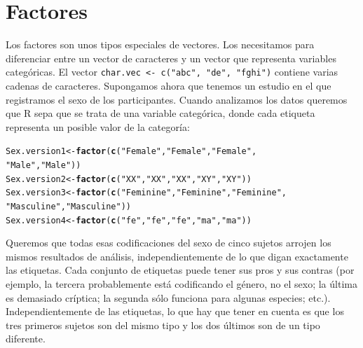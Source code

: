 \documentclass{config/apuntes}\usepackage[]{graphicx}\usepackage[]{xcolor}
\makeatletter
\newcommand{\hlsng}[1]{\textcolor[rgb]{0.192,0.494,0.8}{#1}}%
\newcommand{\hldef}[1]{\textcolor[rgb]{0.345,0.345,0.345}{#1}}%
\newcommand{\hlkwb}[1]{\textcolor[rgb]{0.69,0.353,0.396}{#1}}%
\newcommand{\hlkwd}[1]{\textcolor[rgb]{0.737,0.353,0.396}{\textbf{#1}}}%
\newenvironment{kframe}{%
 \def\at@end@of@kframe{}%
 \ifinner\ifhmode%
  \def\at@end@of@kframe{\end{minipage}}%
  \begin{minipage}{\columnwidth}%
 \fi\fi%
 \def\FrameCommand##1{\hskip\@totalleftmargin \hskip-\fboxsep
 \colorbox{shadecolor}{##1}\hskip-\fboxsep
     \hskip-\linewidth \hskip-\@totalleftmargin \hskip\columnwidth}%
 \MakeFramed {\advance\hsize-\width
   \@totalleftmargin\z@ \linewidth\hsize
   \@setminipage}}%
 {\par\unskip\endMakeFramed%
 \at@end@of@kframe}
\newenvironment{knitrout}{}{} %
\newcommand{\code}[1]{\texttt{#1}}
\makeatother
\begin{document}
\section{Factores}
Los factores son unos tipos especiales de vectores. Los necesitamos para diferenciar entre un vector de caracteres y un vector que representa variables categóricas. El vector \code{char.vec <- c("abc", "de", "fghi")} contiene varias cadenas de caracteres. Supongamos ahora que tenemos un estudio en el que registramos el sexo de los participantes. Cuando analizamos los datos queremos que R sepa que se trata de una variable categórica, donde cada etiqueta representa un posible valor de la categoría:
\begin{knitrout}
\color{fgcolor}\begin{kframe}
\begin{alltt}
\hldef{Sex.version1} \hlkwb{<-} \hlkwd{factor}\hldef{(}\hlkwd{c}\hldef{(}\hlsng{"Female"}\hldef{,} \hlsng{"Female"}\hldef{,} \hlsng{"Female"}\hldef{,}
                         \hlsng{"Male"}\hldef{,} \hlsng{"Male"}\hldef{))}
\hldef{Sex.version2} \hlkwb{<-} \hlkwd{factor}\hldef{(}\hlkwd{c}\hldef{(}\hlsng{"XX"}\hldef{,} \hlsng{"XX"}\hldef{,} \hlsng{"XX"}\hldef{,} \hlsng{"XY"}\hldef{,} \hlsng{"XY"}\hldef{))}
\hldef{Sex.version3} \hlkwb{<-} \hlkwd{factor}\hldef{(}\hlkwd{c}\hldef{(}\hlsng{"Feminine"}\hldef{,} \hlsng{"Feminine"}\hldef{,} \hlsng{"Feminine"}\hldef{,}
                         \hlsng{"Masculine"}\hldef{,} \hlsng{"Masculine"}\hldef{))}
\hldef{Sex.version4} \hlkwb{<-} \hlkwd{factor}\hldef{(}\hlkwd{c}\hldef{(}\hlsng{"fe"}\hldef{,} \hlsng{"fe"}\hldef{,} \hlsng{"fe"}\hldef{,} \hlsng{"ma"}\hldef{,} \hlsng{"ma"}\hldef{))}
\end{alltt}
\end{kframe}
\end{knitrout}

Queremos que todas esas codificaciones del sexo de cinco sujetos arrojen los mismos resultados de análisis, independientemente de lo que digan exactamente las etiquetas. Cada conjunto de etiquetas puede tener sus pros y sus contras (por ejemplo, la tercera probablemente está codificando el género, no el sexo; la última es demasiado críptica; la segunda sólo funciona para algunas especies; etc.). Independientemente de las etiquetas, lo que hay que tener en cuenta es que los tres primeros sujetos son del mismo tipo y los dos últimos son de un tipo diferente.
\end{document}
